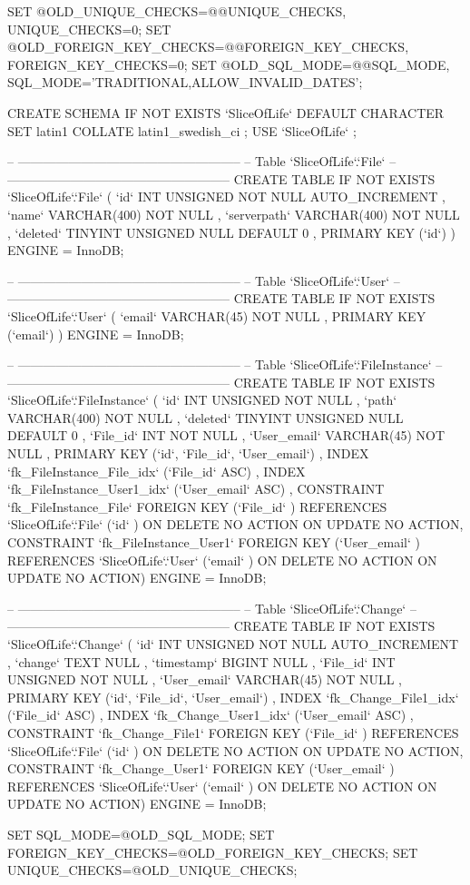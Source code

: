 SET @OLD_UNIQUE_CHECKS=@@UNIQUE_CHECKS, UNIQUE_CHECKS=0;
SET @OLD_FOREIGN_KEY_CHECKS=@@FOREIGN_KEY_CHECKS, FOREIGN_KEY_CHECKS=0;
SET @OLD_SQL_MODE=@@SQL_MODE, SQL_MODE='TRADITIONAL,ALLOW_INVALID_DATES';

CREATE SCHEMA IF NOT EXISTS `SliceOfLife` DEFAULT CHARACTER SET latin1 COLLATE latin1_swedish_ci ;
USE `SliceOfLife` ;

-- -----------------------------------------------------
-- Table `SliceOfLife`.`File`
-- -----------------------------------------------------
CREATE  TABLE IF NOT EXISTS `SliceOfLife`.`File` (
  `id` INT UNSIGNED NOT NULL AUTO_INCREMENT ,
  `name` VARCHAR(400) NOT NULL ,
  `serverpath` VARCHAR(400) NOT NULL ,
  `deleted` TINYINT UNSIGNED NULL DEFAULT 0 ,
  PRIMARY KEY (`id`) )
ENGINE = InnoDB;


-- -----------------------------------------------------
-- Table `SliceOfLife`.`User`
-- -----------------------------------------------------
CREATE  TABLE IF NOT EXISTS `SliceOfLife`.`User` (
  `email` VARCHAR(45) NOT NULL ,
  PRIMARY KEY (`email`) )
ENGINE = InnoDB;


-- -----------------------------------------------------
-- Table `SliceOfLife`.`FileInstance`
-- -----------------------------------------------------
CREATE  TABLE IF NOT EXISTS `SliceOfLife`.`FileInstance` (
  `id` INT UNSIGNED NOT NULL ,
  `path` VARCHAR(400) NOT NULL ,
  `deleted` TINYINT UNSIGNED NULL DEFAULT 0 ,
  `File_id` INT NOT NULL ,
  `User_email` VARCHAR(45) NOT NULL ,
  PRIMARY KEY (`id`, `File_id`, `User_email`) ,
  INDEX `fk_FileInstance_File_idx` (`File_id` ASC) ,
  INDEX `fk_FileInstance_User1_idx` (`User_email` ASC) ,
  CONSTRAINT `fk_FileInstance_File`
    FOREIGN KEY (`File_id` )
    REFERENCES `SliceOfLife`.`File` (`id` )
    ON DELETE NO ACTION
    ON UPDATE NO ACTION,
  CONSTRAINT `fk_FileInstance_User1`
    FOREIGN KEY (`User_email` )
    REFERENCES `SliceOfLife`.`User` (`email` )
    ON DELETE NO ACTION
    ON UPDATE NO ACTION)
ENGINE = InnoDB;


-- -----------------------------------------------------
-- Table `SliceOfLife`.`Change`
-- -----------------------------------------------------
CREATE  TABLE IF NOT EXISTS `SliceOfLife`.`Change` (
  `id` INT UNSIGNED NOT NULL AUTO_INCREMENT ,
  `change` TEXT NULL ,
  `timestamp` BIGINT NULL ,
  `File_id` INT UNSIGNED NOT NULL ,
  `User_email` VARCHAR(45) NOT NULL ,
  PRIMARY KEY (`id`, `File_id`, `User_email`) ,
  INDEX `fk_Change_File1_idx` (`File_id` ASC) ,
  INDEX `fk_Change_User1_idx` (`User_email` ASC) ,
  CONSTRAINT `fk_Change_File1`
    FOREIGN KEY (`File_id` )
    REFERENCES `SliceOfLife`.`File` (`id` )
    ON DELETE NO ACTION
    ON UPDATE NO ACTION,
  CONSTRAINT `fk_Change_User1`
    FOREIGN KEY (`User_email` )
    REFERENCES `SliceOfLife`.`User` (`email` )
    ON DELETE NO ACTION
    ON UPDATE NO ACTION)
ENGINE = InnoDB;



SET SQL_MODE=@OLD_SQL_MODE;
SET FOREIGN_KEY_CHECKS=@OLD_FOREIGN_KEY_CHECKS;
SET UNIQUE_CHECKS=@OLD_UNIQUE_CHECKS;
